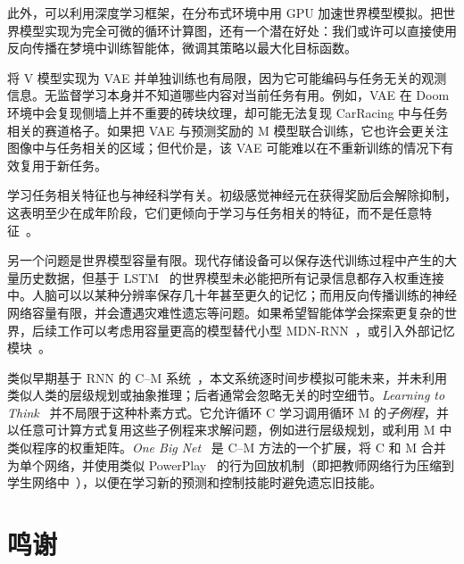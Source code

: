 \documentclass{article}
\begin{document}
此外，可以利用深度学习框架，在分布式环境中用 GPU 加速世界模型模拟。把世界模型实现为完全可微的循环计算图，还有一个潜在好处：我们或许可以直接使用反向传播在梦境中训练智能体，微调其策略以最大化目标函数\cite{s05_making_the_world_differentiable,s05a_cm,s05b_rl}。

将 V 模型实现为 VAE 并单独训练也有局限，因为它可能编码与任务无关的观测信息。无监督学习本身并不知道哪些内容对当前任务有用。例如，VAE 在 Doom 环境中会复现侧墙上并不重要的砖块纹理，却可能无法复现 CarRacing 中与任务相关的赛道格子。如果把 VAE 与预测奖励的 M 模型联合训练，它也许会更关注图像中与任务相关的区域；但代价是，该 VAE 可能难以在不重新训练的情况下有效复用于新任务。

学习任务相关特征也与神经科学有关。初级感觉神经元在获得奖励后会解除抑制，这表明至少在成年阶段，它们更倾向于学习与任务相关的特征，而不是任意特征~\cite{Pi2013}。


另一个问题是世界模型容量有限。现代存储设备可以保存迭代训练过程中产生的大量历史数据，但基于 LSTM~\cite{lstm,s12_lstm_forget} 的世界模型未必能把所有记录信息都存入权重连接中。人脑可以以某种分辨率保存几十年甚至更久的记忆\cite{brain_capacity}；而用反向传播训练的神经网络容量有限，并会遭遇灾难性遗忘等问题\cite{Ratcliff1990,French1994,Kirkpatrick2016}。如果希望智能体学会探索更复杂的世界，后续工作可以考虑用容量更高的模型替代小型 MDN-RNN~\cite{outrageously_large_neural_nets,hypernetworks,suarez2017,wavenet,attention}，或引入外部记忆模块~\cite{Gemici2017}。

类似早期基于 RNN 的 C--M 系统~\cite{s05_making_the_world_differentiable,s05a_cm,s05b_rl,s05c_boredom}，本文系统逐时间步模拟可能未来，并未利用类似人类的层级规划或抽象推理；后者通常会忽略无关的时空细节。\textit{Learning to Think}~\cite{learning_to_think} 并不局限于这种朴素方式。它允许循环 C 学习调用循环 M 的\textit{子例程}，并以任意可计算方式复用这些子例程来求解问题，例如进行层级规划，或利用 M 中类似程序的权重矩阵。\textit{One Big Net}~\cite{onebignet2018} 是 C--M 方法的一个扩展，将 C 和 M 合并为单个网络，并使用类似 PowerPlay~\cite{s10_powerplay,s11_powerplay} 的行为回放机制（即把教师网络行为压缩到学生网络中~\cite{chunker91and92}），以便在学习新的预测和控制技能时避免遗忘旧技能。

\section*{鸣谢}
\end{document}
